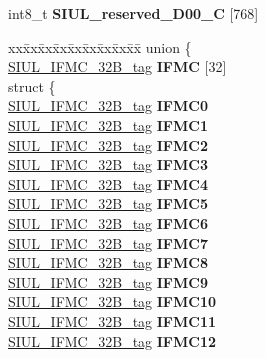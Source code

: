 \begin{DoxyCompactItemize}
\begin{tabbing}
\end{tabbing}\item 
\mbox{\label{structSIU__tag_aa3c41cdf6e0f746493c9bb1f444aa517}} 
int8\+\_\+t {\bfseries S\+I\+U\+L\+\_\+reserved\+\_\+D00\+\_\+C} \mbox{[}768\mbox{]}
\item 
\mbox{\label{structSIU__tag_ad5dc162654fc2983d4188ea9e2c2a182}} 
\begin{tabbing}
xx\=xx\=xx\=xx\=xx\=xx\=xx\=xx\=xx\=\kill
union \{\\
\>\mbox{\hyperlink{unionSIUL__IFMC__32B__tag}{SIUL\_IFMC\_32B\_tag}} {\bfseries IFMC} \mbox{[}32\mbox{]}\\
\mbox{\label{unionSIU__tag_1_1_0D1552_ad1583d7cb01416daf4c6c700e41c565c}} 
\>struct \{\\
\>\>\mbox{\hyperlink{unionSIUL__IFMC__32B__tag}{SIUL\_IFMC\_32B\_tag}} {\bfseries IFMC0}\\
\>\>\mbox{\hyperlink{unionSIUL__IFMC__32B__tag}{SIUL\_IFMC\_32B\_tag}} {\bfseries IFMC1}\\
\>\>\mbox{\hyperlink{unionSIUL__IFMC__32B__tag}{SIUL\_IFMC\_32B\_tag}} {\bfseries IFMC2}\\
\>\>\mbox{\hyperlink{unionSIUL__IFMC__32B__tag}{SIUL\_IFMC\_32B\_tag}} {\bfseries IFMC3}\\
\>\>\mbox{\hyperlink{unionSIUL__IFMC__32B__tag}{SIUL\_IFMC\_32B\_tag}} {\bfseries IFMC4}\\
\>\>\mbox{\hyperlink{unionSIUL__IFMC__32B__tag}{SIUL\_IFMC\_32B\_tag}} {\bfseries IFMC5}\\
\>\>\mbox{\hyperlink{unionSIUL__IFMC__32B__tag}{SIUL\_IFMC\_32B\_tag}} {\bfseries IFMC6}\\
\>\>\mbox{\hyperlink{unionSIUL__IFMC__32B__tag}{SIUL\_IFMC\_32B\_tag}} {\bfseries IFMC7}\\
\>\>\mbox{\hyperlink{unionSIUL__IFMC__32B__tag}{SIUL\_IFMC\_32B\_tag}} {\bfseries IFMC8}\\
\>\>\mbox{\hyperlink{unionSIUL__IFMC__32B__tag}{SIUL\_IFMC\_32B\_tag}} {\bfseries IFMC9}\\
\>\>\mbox{\hyperlink{unionSIUL__IFMC__32B__tag}{SIUL\_IFMC\_32B\_tag}} {\bfseries IFMC10}\\
\>\>\mbox{\hyperlink{unionSIUL__IFMC__32B__tag}{SIUL\_IFMC\_32B\_tag}} {\bfseries IFMC11}\\
\>\>\mbox{\hyperlink{unionSIUL__IFMC__32B__tag}{SIUL\_IFMC\_32B\_tag}} {\bfseries IFMC12}\\

\end{tabbing}
\end{DoxyCompactItemize}

